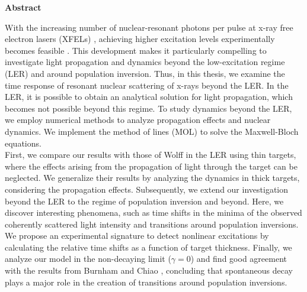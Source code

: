 \thispagestyle{empty}
  \noindent\sffamily\textbf{Abstract}
	\\[1em]\normalfont\normalsize

With the increasing number of nuclear-resonant photons per pulse at x-ray free electron lasers (XFELs) \cite{scientific_opp_XFEL}, achieving higher excitation levels experimentally becomes feasible \cite{Shvydko2023}. This development makes it particularly compelling to investigate light propagation and dynamics beyond the low-excitation regime (LER) and around population inversion. Thus, in this thesis, we examine the time response of resonant nuclear scattering of x-rays beyond the LER. In the LER, it is possible to obtain an analytical solution for light propagation, which becomes not possible beyond this regime. To study dynamics beyond the LER, we employ numerical methods to analyze propagation effects and nuclear dynamics. We implement the method of lines (MOL) to solve the Maxwell-Bloch equations.\\

First, we compare our results with those of Wolff \cite{wolff2023characterization} in the LER using thin targets, where the effects arising from the propagation of light through the target can be neglected. We generalize their results by analyzing the dynamics in thick targets, considering the propagation effects. Subsequently, we extend our investigation beyond the LER to the regime of population inversion and beyond. Here, we discover interesting phenomena, such as time shifts in the minima of the observed coherently scattered light intensity and transitions around population inversions. We propose an experimental signature to detect nonlinear excitations by calculating the relative time shifts as a function of target thickness. Finally, we analyze our model in the non-decaying limit ($\gamma = 0$) and find good agreement with the results from Burnham and Chiao \cite{BURNHAM1969}, concluding that spontaneous decay plays a major role in the creation of transitions around population inversions.


